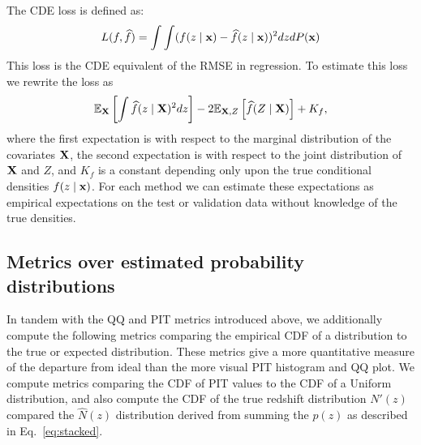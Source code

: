 
The CDE loss is defined as:
\begin{equation} \label{eq:cde-loss}
L(f, \widehat{f}) = \int \int (f(z \mid {\mathbf{x}}) - \widehat{f}(z \mid {\mathbf{x}}))^{2} dz dP({\mathbf{x}})
\end{equation}
This loss is the CDE equivalent of the RMSE in regression. To estimate this loss we rewrite the loss as
\begin{equation} \label{eq:estimated-cde-loss}
\mathbb{E}_{\mathbf{X}} \left[\int \widehat{f}(z \mid {\mathbf{X}})^{2} dz\right] - 2 \mathbb{E}_{{\mathbf{X}},Z}\left[\widehat{f}(Z \mid {\mathbf{X}})\right] + K_{f},
\end{equation}
where the first expectation is with respect to the marginal distribution of the covariates ${\mathbf{X}}$, the second expectation is with respect to the joint distribution of ${\mathbf{X}}$ and $Z$, and $K_{f}$ is a constant depending only upon the true conditional densities $f(z\mid {\mathbf{x}})$.
For each method we can estimate these expectations as empirical expectations on the test or validation data \citep[Eq.~7 in][]{Izbicki:17b} without knowledge of the true densities.


\subsection{Metrics over estimated probability distributions}
\label{sec:quantmet}

In tandem with the QQ and PIT metrics introduced above, we additionally compute the following metrics comparing the empirical CDF of a distribution to the true or expected distribution.  These metrics give a more quantitative measure of the departure from ideal than the more visual PIT histogram and QQ plot.  We compute metrics comparing the CDF of PIT values to the CDF of a Uniform distribution, and also compute the CDF of the true redshift distribution $N'(z)$ compared the $\hat{N}(z)$ distribution derived from summing the $p(z)$ as described in Eq.~\ref{eq:stacked}.

